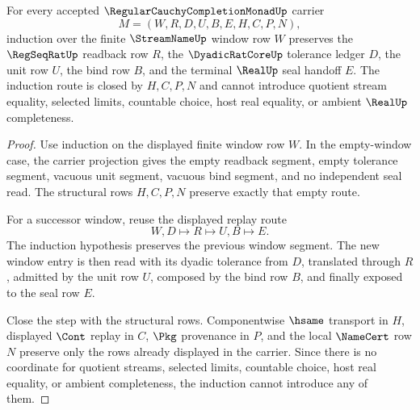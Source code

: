 \begin{theorem}
\label{thm:regular-cauchy-completion-monad-window-induction}
For every accepted $\RegularCauchyCompletionMonadUp$ carrier
$$
M=(W,R,D,U,B,E,H,C,P,N),
$$
induction over the finite $\StreamNameUp$ window row $W$ preserves the $\RegSeqRatUp$ readback row $R$, the $\DyadicRatCoreUp$ tolerance ledger $D$, the unit row $U$, the bind row $B$, and the terminal $\RealUp$ seal handoff $E$. The induction route is closed by $H,C,P,N$ and cannot introduce quotient stream equality, selected limits, countable choice, host real equality, or ambient $\RealUp$ completeness.
\end{theorem}
\begin{proof}
Use induction on the displayed finite window row $W$. In the empty-window case, the carrier projection gives the empty readback segment, empty tolerance segment, vacuous unit segment, vacuous bind segment, and no independent seal read. The structural rows $H,C,P,N$ preserve exactly that empty route.

For a successor window, reuse the displayed replay route
$$
W,D \longmapsto R \longmapsto U,B \longmapsto E .
$$
The induction hypothesis preserves the previous window segment. The new window entry is then read with its dyadic tolerance from $D$, translated through $R$, admitted by the unit row $U$, composed by the bind row $B$, and finally exposed to the seal row $E$.

Close the step with the structural rows. Componentwise $\hsame$ transport in $H$, displayed $\Cont$ replay in $C$, $\Pkg$ provenance in $P$, and the local $\NameCert$ row $N$ preserve only the rows already displayed in the carrier. Since there is no coordinate for quotient streams, selected limits, countable choice, host real equality, or ambient completeness, the induction cannot introduce any of them.
\end{proof}



